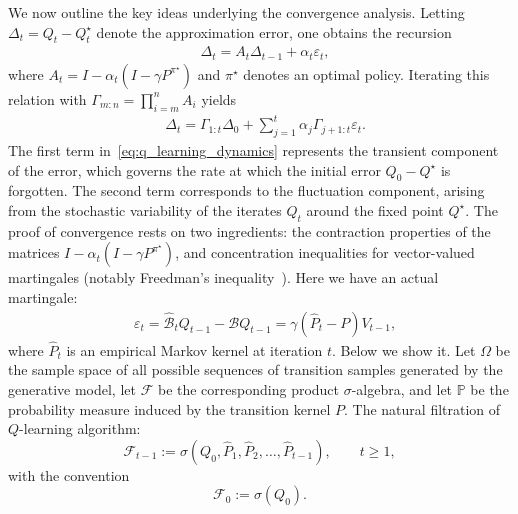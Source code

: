 \documentclass{article}
\numberwithin{equation}{section}
\newcommand{\cF}{\mathcal{F}}
\begin{document}
We now outline the key ideas underlying the convergence analysis. Letting $\Delta_t = Q_t - Q^\star_t$ denote the approximation error, one obtains the recursion
\begin{equation}\label{eq:q_learning_martingale_error_recursion}
    \begin{aligned}
        &\Delta_t = A_t\Delta_{t - 1} + \alpha_t\varepsilon_t,
    \end{aligned}
\end{equation}
where $A_t = I - \alpha_t(I - \gamma P^{\pi^\star})$ and $\pi^\star$ denotes an optimal policy. Iterating this relation with $\Gamma_{m:n} = \prod_{i = m}^nA_i$ yields
\begin{equation}\label{eq:q_learning_dynamics}
    \begin{aligned}
        &\Delta_{t} = \Gamma_{1:t}\Delta_0 + \sum\limits_{j = 1}^t\alpha_j\Gamma_{j+1:t}\varepsilon_t.
    \end{aligned}
\end{equation}
The first term in~\eqref{eq:q_learning_dynamics} represents the transient component of the error, which governs the rate at which the initial error $Q_0 - Q^\star$ is forgotten. The second term corresponds to the fluctuation component, arising from the stochastic variability of the iterates $Q_t$ around the fixed point $Q^\star$. The proof of convergence rests on two ingredients: the contraction properties of the matrices $I - \alpha_t(I - \gamma P^{\pi^\star})$, and concentration inequalities for vector-valued martingales (notably Freedman’s inequality~\cite{tropp2011freedman}). Here we have an actual martingale:
\begin{equation*}
    \begin{aligned}
        &\varepsilon_t = \mathcal{\widehat{B}}_tQ_{t - 1} - \mathcal{B}Q_{t - 1} = \gamma\left(\widehat{P}_t - P\right)V_{t - 1},
    \end{aligned}
\end{equation*}
where $\widehat{P}_t$ is an empirical Markov kernel at iteration $t$. Below we show it. Let \(\Omega\) be the sample space of all possible sequences of transition samples generated by the generative model, let \(\cF\) be the corresponding product \(\sigma\)-algebra, and let \(\mathbb{P}\) be the probability measure induced by the transition kernel \(P\). The natural filtration of $Q$-learning algorithm:
\[
    \cF_{t - 1}
    :=
    \sigma\!\left(
        Q_0,\widehat P_1,\widehat P_2,\ldots,\widehat P_{t - 1}
    \right),
    \qquad
    t\geq1,
\]
with the convention
\[
    \cF_0:=\sigma(Q_0).
\]
\end{document}
